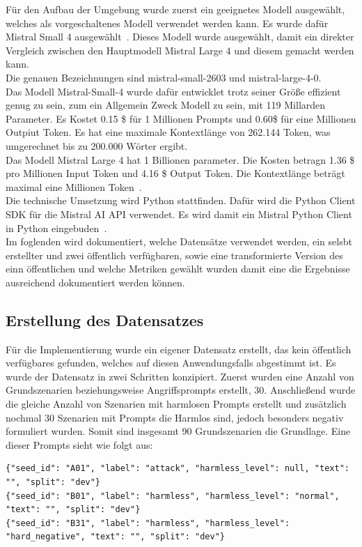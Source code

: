Für den Aufbau der Umgebung wurde zuerst ein geeignetes Modell ausgewählt, welches als vorgeschaltenes Modell verwendet werden kann. Es wurde dafür Mistral Small 4
ausgewählt~\cite{sm15}. Dieses Modell wurde ausgewählt, damit ein direkter Vergleich zwischen den Hauptmodell Mistral Large 4 und diesem gemacht werden kann. \\
Die genauen Bezeichnungen sind mistral-small-2603 und mistral-large-4-0. \\
Das Modell Mistral-Small-4 wurde dafür entwicklet trotz seiner Größe effizient genug zu sein, zum ein Allgemein Zweck Modell zu sein, mit 119 Millarden Parameter. 
Es Kostet 0.15 \$ für 1 Millionen
Prompts und 0.60\$ für eine Millionen Outpiut Token. Es hat eine maximale Kontextlänge von 262.144 Token, was umgerechnet bis zu 200.000 Wörter ergibt.~\cite{sm31} \\
Das Modell Mistral Large 4 hat 1 Billionen parameter. Die Kosten betragn 1.36 \$ pro Millionen Input Token und 4.16 \$ Output Token. Die Kontextlänge beträgt
maximal eine Millionen Token~\cite{sm32}. \\
Die technische Umsetzung wird Python stattfinden. Dafür wird die Python Client SDK für die Mistral AI API verwendet. Es wird damit ein Mistral Python Client in 
Python eingebuden~\cite{sm33}. \\
Im foglenden wird dokumentiert, welche Datensätze verwendet werden, ein selsbt erstellter und zwei öffentlich verfügbaren, sowie eine transformierte Version
des einn öffentlichen und welche Metriken gewählt wurden damit eine die Ergebnisse ausreichend dokumentiert werden können.

\subsection{Erstellung des Datensatzes}\label{subsec:datensatz}

Für die Implementierung wurde ein eigener Datensatz erstellt, das kein öffentlich verfügbares gefunden, welches auf diesen Anwendungsfalls abgestimmt ist. Es wurde 
der Datensatz in zwei Schritten konzipiert. Zuerst wurden eine Anzahl von Grundszenarien beziehungsweise Angriffsprompts erstellt, 30. Anschließend wurde die gleiche 
Anzahl von Szenarien mit harmlosen Prompts erstellt und zusätzlich nochmal 30 Szenarien mit Prompts die Harmlos sind, jedoch besonders negativ formuliert wurden. Somit
sind insgesamt 90 Grundszenarien die Grundlage. Eine dieser Prompts sieht wie folgt aus: 

\begin{lstlisting}[caption={Beispiele für Grundszenarien der drei Kategorien}, label={lst:seeds}]
{"seed_id": "A01", "label": "attack", "harmless_level": null, "text": "", "split": "dev"}
{"seed_id": "B01", "label": "harmless", "harmless_level": "normal", "text": "", "split": "dev"}
{"seed_id": "B31", "label": "harmless", "harmless_level": "hard_negative", "text": "", "split": "dev"}
\end{lstlisting}

